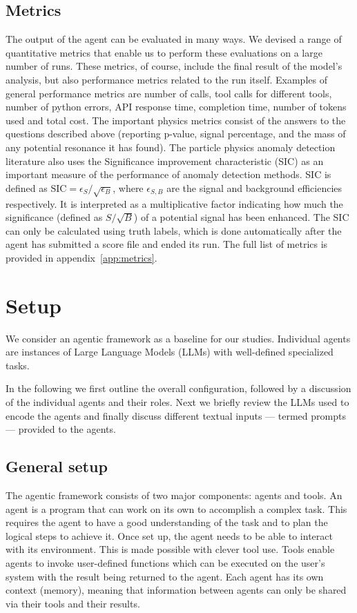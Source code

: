 \documentclass[submission, Phys]{SciPost}
\begin{document}
\subsection{Metrics}
\label{sec:metrics}
The output of the agent can be evaluated in many ways. We devised a range of quantitative metrics that enable us to perform these evaluations on a large number of runs. These metrics, of course, include the final result of the model's analysis, but also performance metrics related to the run itself. Examples of general performance metrics  are number of calls, tool calls for different tools, number of python errors, API response time, completion time, number of tokens used and total cost. The important physics metrics consist of the answers to the questions described above (reporting p-value, signal percentage, and the mass of any potential resonance it has found). The particle physics anomaly detection literature also uses the Significance improvement characteristic (SIC) as an important measure of the performance of anomaly detection methods. SIC is defined as $\mathrm{SIC}=\epsilon_S/\sqrt{\epsilon_B}$, where $\epsilon_{S,B}$ are the signal and background efficiencies respectively. It is interpreted as a multiplicative factor indicating how much the significance (defined as $S/\sqrt{B}$) of a potential signal has been enhanced. The SIC can only be calculated using truth labels, which is done automatically after the agent has submitted a score file and ended its run. The full list of metrics is provided in appendix~\ref{app:metrics}.




\section{Setup}
\label{sec:setup}
We consider an agentic framework as a baseline for our studies. Individual agents are instances of Large Language Models (LLMs) with well-defined specialized tasks.

In the following we first outline the overall configuration, followed by a discussion of the individual agents and their roles. Next we briefly review the LLMs used to encode the agents and finally discuss different textual inputs --- termed prompts --- provided to the agents.

\subsection{General setup}
\label{sec:general_setup}
The agentic framework consists of two major components: agents and tools. An agent is a program that can work on its own to accomplish a complex task. This requires the agent to have a good understanding of the task and to plan the logical steps to achieve it. Once set up, the agent needs to be able to interact with its environment. This is made possible with clever tool use. Tools enable agents to invoke user-defined functions which can be executed on the user's system with the result being returned to the agent. Each agent has its own context (memory), meaning that information between agents can only be shared via their tools and their results.
\end{document}

